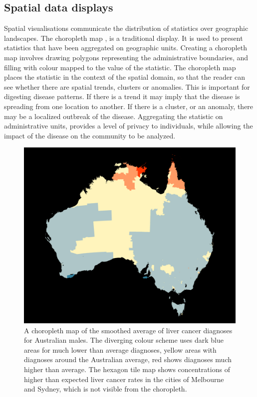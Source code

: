 \documentclass{monashthesis}
\begin{document}
\hypertarget{spatial-data-displays}{%
\subsection{Spatial data displays}\label{spatial-data-displays}}

Spatial visualisations communicate the distribution of statistics over geographic landscapes. The choropleth map \autocite{EI}, \autocite{BCM} is a traditional display. It is used to present statistics that have been aggregated on geographic units. Creating a choropleth map involves drawing polygons representing the administrative boundaries, and filling with colour mapped to the value of the statistic. The choropleth map places the statistic in the context of the spatial domain, so that the reader can see whether there are spatial trends, clusters or anomalies. This is important for digesting disease patterns. If there is a trend it may imply that the disease is spreading from one location to another. If there is a cluster, or an anomaly, there may be a localized outbreak of the disease. Aggregating the statistic on administrative units, provides a level of privacy to individuals, while allowing the impact of the disease on the community to be analyzed.

\begin{figure}[H]
\centering
\includegraphics[width=16cm]{figures/04-experiment/aus_liver_m.pdf}
\caption{\label{fig:liver-geo}A choropleth map of the smoothed average of liver cancer diagnoses for Australian males. The diverging colour scheme uses dark blue areas for much lower than average diagnoses, yellow areas with diagnoses around the Australian average, red shows diagnoses much higher than average. The hexagon tile map shows concentrations of higher than expected liver cancer rates in the cities of Melbourne and Sydney, which is not visible from the choropleth.}
\end{figure}
\end{document}
